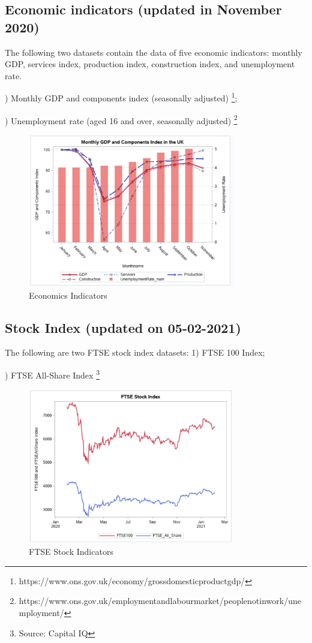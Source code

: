 \documentclass[12pt, a4paper]{report}
\begin{document}
\subsection{Economic indicators (updated in November 2020)} 
The following two datasets contain the data of five economic indicators: monthly GDP, services index, 
production index, construction index, and unemployment rate.\par
{}) Monthly GDP and components index (seasonally adjusted)
\footnote[4]{https://www.ons.gov.uk/economy/grossdomesticproductgdp/};\par
{}) Unemployment rate (aged 16 and over, seasonally adjusted)
\footnote[5]{https://www.ons.gov.uk/employmentandlabourmarket/peoplenotinwork/unemployment/}
\begin{figure}[H] 
\centering 
\includegraphics[width=9cm]{economics.jpg} 
\caption{Economics Indicators}
\end{figure}
    
\subsection{Stock Index (updated on 05-02-2021)}
The following are two FTSE stock index datasets:
1) FTSE 100 Index;\par
{}) FTSE All-Share Index
\footnote[6]{Source: Capital IQ}
\begin{figure}[H] 
\centering 
\includegraphics[width=9cm]{ftse.jpg} 
\caption{FTSE Stock Indicators}
\end{figure}
        
\end{document}
